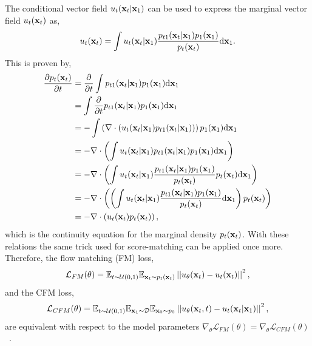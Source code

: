The conditional vector field $u_t(\mathbf{x}_t | \mathbf{x}_1)$ can be used to express the marginal vector field $u_t(\mathbf{x}_t)$ as,
\begin{equation}
    \label{eq:conditional_to_marginal}
    u_t(\mathbf{x}_t) = \int u_t(\mathbf{x}_t | \mathbf{x}_1) \frac{p_{t1}(\mathbf{x}_t | \mathbf{x}_1) p_1(\mathbf{x}_1)}{p_t(\mathbf{x}_t)} \mathrm{d} \mathbf{x}_1.
\end{equation}
This is proven by,
\begin{equation}
    \begin{aligned}
        \frac{\partial p_t(\mathbf{x}_t)}{\partial t}
         & = \frac{\partial}{\partial t} \int p_{t1}(\mathbf{x}_t | \mathbf{x}_1) p_1(\mathbf{x}_1) \mathrm{d} \mathbf{x}_1                                                            \\
         & = \int \frac{\partial}{\partial t} p_{t1}(\mathbf{x}_t | \mathbf{x}_1) p_1(\mathbf{x}_1) \mathrm{d} \mathbf{x}_1                                                            \\
         & = - \int \left(\nabla \cdot (u_t(\mathbf{x}_t | \mathbf{x}_1) p_{t1}(\mathbf{x}_t | \mathbf{x}_1))\right) p_1(\mathbf{x}_1) \mathrm{d} \mathbf{x}_1                                         \\
         & = - \nabla \cdot \left(\int u_t(\mathbf{x}_t | \mathbf{x}_1) p_{t1}(\mathbf{x}_t | \mathbf{x}_1) p_1(\mathbf{x}_1) \mathrm{d} \mathbf{x}_1\right)                                           \\
         & = - \nabla \cdot \left(\int u_t(\mathbf{x}_t | \mathbf{x}_1) \frac{p_{t1}(\mathbf{x}_t | \mathbf{x}_1) p_1(\mathbf{x}_1)}{p_t(\mathbf{x}_t)} p_t(\mathbf{x}_t) \mathrm{d} \mathbf{x}_1\right)               \\
         & = - \nabla \cdot \left(\left(\int u_t(\mathbf{x}_t | \mathbf{x}_1) \frac{p_{t1}(\mathbf{x}_t | \mathbf{x}_1) p_1(\mathbf{x}_1)}{p_t(\mathbf{x}_t)} \mathrm{d} \mathbf{x}_1\right) p_t(\mathbf{x}_t) \right) \\
         & = - \nabla \cdot \left(u_t(\mathbf{x}_t) p_t(\mathbf{x}_t)\right),
    \end{aligned}
\end{equation}
which is the continuity equation for the marginal density $p_t(\mathbf{x}_t)$.
With these relations the same trick used for score-matching can be applied once more.
Therefore, the flow matching (FM) loss,
\begin{equation}
    \label{eq:fm_loss}
    \mathcal{L}_{FM}(\theta) =
    \mathbb{E}_{t \sim \mathcal{U}(0, 1)}
    \mathbb{E}_{\mathbf{x}_t \sim p_t(\mathbf{x}_t)}
    \left|\left|u_\theta(\mathbf{x}_t) - u_t(\mathbf{x}_t)\right|\right|^2,
\end{equation}
and the \Gls{CFM} loss,
\begin{equation}
    \label{eq:cfm_loss}
    \mathcal{L}_{CFM}(\theta) =
    \mathbb{E}_{t \sim \mathcal{U}(0, 1)}
    \mathbb{E}_{\mathbf{x}_1 \sim \mathcal{D}}
    \mathbb{E}_{\mathbf{x}_0 \sim p_0}
    \left|\left|u_\theta(\mathbf{x}_t, t) - u_t(\mathbf{x}_t | \mathbf{x}_1)\right|\right|^2,
\end{equation}
are equivalent with respect to the model parameters $\nabla_{\theta} \mathcal{L}_{FM}(\theta) = \nabla_{\theta} \mathcal{L}_{CFM}(\theta)$~\cite{FlowMatchingGenerative}.

